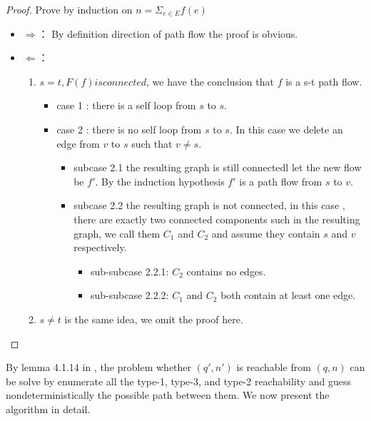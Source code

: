 \documentclass[12pt]{article}
\newtheorem{proof}{\textit{Proof}}
\begin{document}
\begin{proof} Prove by induction on $n  = \Sigma_{e\in E} f(e)$\\
\begin{itemize}
\item $\Rightarrow$：
 By definition direction of path flow the proof is obvious.

\item $\Leftarrow$：
\begin{enumerate}
\item $s = t, F(f) is connected$, we have the conclusion that $f$ is a s-t path flow.

\begin{itemize}
\item case 1 : there is a self loop from $s$ to $s$.

\item case 2 : there is no self loop from $s$ to $s$. In this case we delete an edge from $v$ to $s$ such that $v \neq s$.

\begin{itemize}
\item subcase 2.1 the resulting graph is still connectedl let the new flow be $f'$. By the induction hypothesis $f'$ is a path flow from $s$ to $v$.

\item subcase 2.2 the resulting graph is not connected, in this case , there are exactly two connected components such in the resulting graph, we call them $C_1$ and $C_2$ and assume they contain $s$ and $v$ respectively.
\begin{itemize}
\item sub-subcase 2.2.1:
$C_2$ contains no edges.

\item sub-subcase 2.2.2:
$C_1$ and $C_2$ both contain at least one edge.

\end{itemize}
\end{itemize}
\end{itemize}

\item $s \ne t$ is the same idea, we omit the proof here.

\end{enumerate}
\end{itemize}


\end{proof}

By lemma 4.1.14 in \cite{DBLP:conf/icalp/ChistikovH17}, the problem whether $(q',n')$ is reachable from $(q,n)$ can be solve by enumerate all the type-1, type-3, and type-2 reachability and guess nondeterministically the possible path between them. We now present the algorithm in detail.
\end{document}
